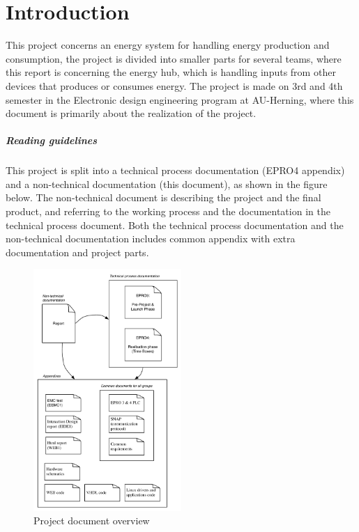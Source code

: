 \chapter{Introduction}
This project concerns an energy system for handling energy production and consumption, the project is divided into smaller parts for several teams, where this report is concerning the energy hub, which is handling inputs from other devices that produces or consumes energy. The project is made on 3rd and 4th semester in the Electronic design engineering program at AU-Herning, where this document is primarily about the realization of the project.
\paragraph{Reading guidelines}
This project is split into a technical process documentation (EPRO4 appendix) and a non-technical documentation (this document), as shown in the figure below. The non-technical document is describing the project and the final product, and referring to the working process and the documentation in the technical process document. Both the technical process documentation and the non-technical documentation includes common appendix with extra documentation and project parts.
\begin{figure}[H]
	\begin{centering}
		 \includegraphics[width=0.5\textwidth]{images/report_ref.pdf}
		\caption*{Project document overview}
	\end{centering}
\end{figure}
